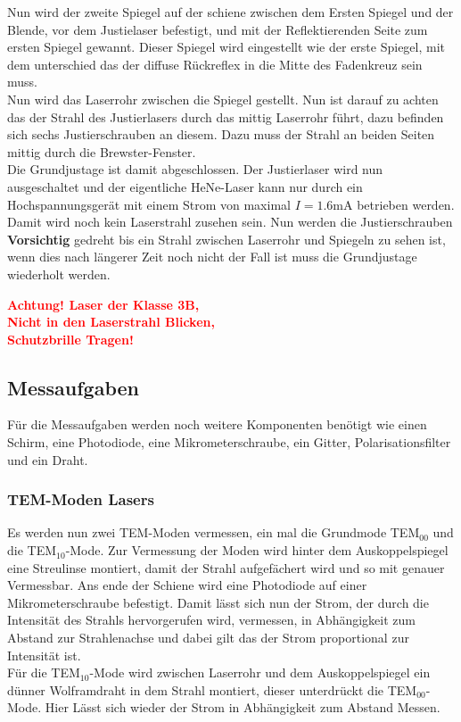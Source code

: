 Nun wird der zweite Spiegel auf der schiene zwischen dem Ersten Spiegel und der Blende, vor dem Justielaser befestigt, und mit der Reflektierenden Seite zum ersten Spiegel gewannt. Dieser Spiegel wird eingestellt wie der erste Spiegel, mit dem unterschied das der diffuse Rückreflex in die Mitte des Fadenkreuz sein muss.\\
Nun wird das Laserrohr zwischen die Spiegel gestellt. Nun ist darauf zu achten das der Strahl des Justierlasers durch das mittig Laserrohr führt, dazu befinden sich sechs Justierschrauben an diesem. Dazu muss der Strahl an beiden Seiten mittig durch die Brewster-Fenster.\\
Die Grundjustage ist damit abgeschlossen. Der Justierlaser wird nun ausgeschaltet und der eigentliche HeNe-Laser kann nur durch ein Hochspannungsgerät mit einem Strom von maximal $I=1.6$mA betrieben werden. Damit wird noch kein Laserstrahl zusehen sein. Nun werden die Justierschrauben \textbf{Vorsichtig} gedreht bis ein Strahl zwischen Laserrohr und Spiegeln zu sehen ist, wenn dies nach längerer Zeit noch nicht der Fall ist muss die Grundjustage wiederholt werden.\\
\begin{center}
\textbf{\textcolor{red}{Achtung! Laser der Klasse 3B,}\centering}\\ 
\textbf{\textcolor{red}{Nicht in den Laserstrahl Blicken,}\centering}\\
\textbf{\textcolor{red}{Schutzbrille Tragen!}\centering}
\end{center}

\subsection{Messaufgaben}
Für die Messaufgaben werden noch weitere Komponenten benötigt wie einen Schirm, eine Photodiode, eine Mikrometerschraube, ein Gitter, Polarisationsfilter und ein Draht.
\subsubsection{TEM-Moden Lasers}
Es werden nun zwei TEM-Moden vermessen, ein mal die Grundmode TEM${}_{00}$ und die TEM${}_{10}$-Mode. Zur Vermessung der Moden wird hinter dem Auskoppelspiegel eine Streulinse montiert, damit der Strahl aufgefächert wird und so mit genauer Vermessbar. Ans ende der Schiene wird eine Photodiode auf einer Mikrometerschraube befestigt. Damit lässt sich nun der Strom, der durch die Intensität des Strahls hervorgerufen wird, vermessen, in Abhängigkeit zum Abstand zur Strahlenachse und dabei gilt das der Strom proportional zur Intensität ist. \\
Für die TEM${}_{10}$-Mode wird zwischen Laserrohr und dem Auskoppelspiegel ein dünner Wolframdraht in dem Strahl montiert, dieser unterdrückt die TEM${}_{00}$-Mode. Hier Lässt sich wieder der Strom in Abhängigkeit zum Abstand Messen.
